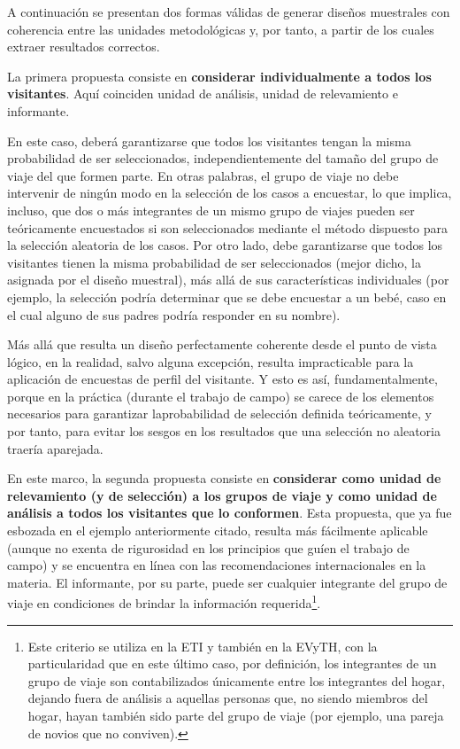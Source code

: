 \documentclass[
]{book}
\begin{document}
A continuación se presentan dos formas válidas de generar diseños muestrales con coherencia entre las unidades metodológicas y, por tanto, a partir de los cuales extraer resultados correctos.

La primera propuesta consiste en \textbf{considerar individualmente a todos los visitantes}. Aquí coinciden unidad de análisis, unidad de relevamiento e informante.

En este caso, deberá garantizarse que todos los visitantes tengan la misma probabilidad de ser seleccionados, independientemente del tamaño del grupo de viaje del que formen parte. En otras palabras, el grupo de viaje no debe intervenir de ningún modo en la selección de los casos a encuestar, lo que implica, incluso, que dos o más integrantes de un mismo grupo de viajes pueden ser teóricamente encuestados si son seleccionados mediante el método dispuesto para la selección aleatoria de los casos. Por otro lado, debe garantizarse que todos los visitantes tienen la misma probabilidad de ser seleccionados (mejor dicho, la asignada por el diseño muestral), más allá de sus características individuales (por ejemplo, la selección podría determinar que se debe encuestar a un bebé, caso en el cual alguno de sus padres podría responder en su nombre).

Más allá que resulta un diseño perfectamente coherente desde el punto de vista lógico, en la realidad, salvo alguna excepción, resulta impracticable para la aplicación de encuestas de perfil del visitante. Y esto es así, fundamentalmente, porque en la práctica (durante el trabajo de campo) se carece de los elementos necesarios para garantizar laprobabilidad de selección definida teóricamente, y por tanto, para evitar los sesgos en los resultados que una selección no aleatoria traería aparejada.

En este marco, la segunda propuesta consiste en \textbf{considerar como unidad de relevamiento (y de selección) a los grupos de viaje y como unidad de análisis a todos los visitantes que lo conformen}. Esta propuesta, que ya fue esbozada en el ejemplo anteriormente citado, resulta más fácilmente aplicable (aunque no exenta de rigurosidad en los principios que guíen el trabajo de campo) y se encuentra en línea con las recomendaciones internacionales en la materia. El informante, por su parte, puede ser cualquier integrante del grupo de viaje en condiciones de brindar la información requerida\footnote{Este criterio se utiliza en la ETI y también en la EVyTH, con la particularidad que en este último caso, por definición, los integrantes de un grupo de viaje son contabilizados únicamente entre los integrantes del hogar, dejando fuera de análisis a aquellas personas que, no siendo miembros del hogar, hayan también sido parte del grupo de viaje (por ejemplo, una pareja de novios que no conviven).}.
\end{document}
